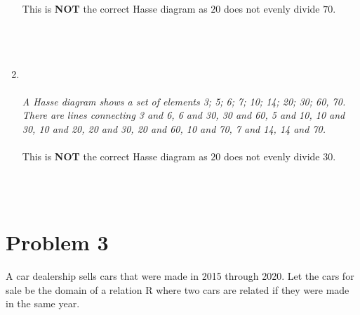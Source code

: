 \documentclass{amsart}
\theoremstyle{definition}
\theoremstyle{Exercise}
\theoremstyle{remark}
\theoremstyle{rule}
\numberwithin{equation}{section}
\begin{document}
\begin{enumerate}[label=(\alph*)]
{{}
}
\\
\\
  This is {\large\bf NOT} the correct Hasse diagram as $20$ does not evenly divide $70$.
\\\\
\newpage
~\\~\\
\item
{}
\\\\
{\color{blue}{\bf Figure 5:} \emph{A Hasse diagram shows a set of elements {3; 5; 6; 7; 10; 14; 20; 30; 60, 70}. There are lines connecting 3 and 6, 6 and 30, 30 and 60, 5 and 10, 10 and 30, 10 and 20, 20 and 30, 20 and 60, 10 and 70, 7 and 14, 14 and 70.
}
}
\\\\
  This is {\large\bf NOT} the correct Hasse diagram as $20$ does not evenly divide $30$.
\\\\

\end{enumerate}
  \newpage
~\\
  \section*{Problem 3}
  A car dealership sells cars that were made in 2015 through 2020. Let the cars for sale be the domain of a relation R where two cars are related if they were made in the same year.
\end{document}
